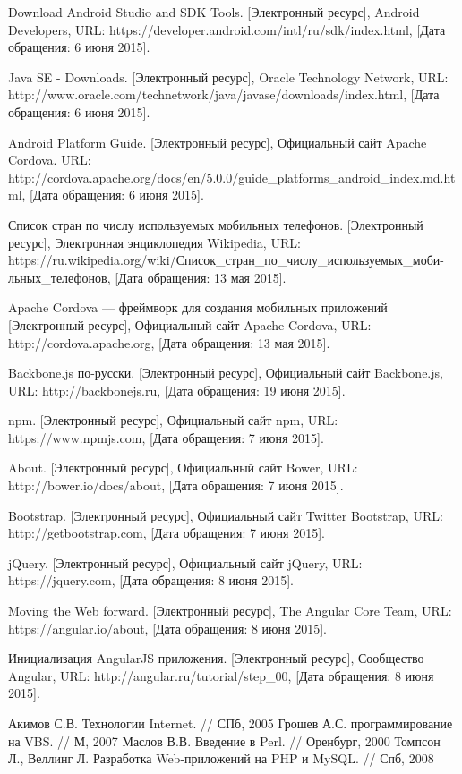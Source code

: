\begin{thebibliography}{1}
 Download Android Studio and SDK Tools. [Электронный ресурс], Android Developers, URL: https://developer.android.com/intl/ru/sdk/index.html, [Дата обращения: 6 июня 2015].

 Java SE - Downloads. [Электронный ресурс], Oracle Technology Network, URL: http://www.oracle.com/technetwork/java/javase/downloads/index.html, [Дата обращения: 6 июня 2015].

 Android Platform Guide. [Электронный ресурс],  Официальный сайт Apache Cordova. URL: http://cordova.apache.org/docs/en/5.0.0/guide\_platforms\_android\_index.md.html, [Дата обращения: 6 июня 2015].

 Список стран по числу используемых мобильных телефонов. [Электронный ресурс], Электронная энциклопедия Wikipedia, URL: https://ru.wikipedia.org/wiki/Список\_стран\_по\_числу\_используемых\_моби- льных\_телефонов, [Дата обращения: 13 мая 2015].

 Apache Cordova --- фреймворк для создания мобильных приложений [Электронный ресурс], Официальный сайт Apache Cordova, URL: http://cordova.apache.org, [Дата обращения: 13 мая 2015].

 Backbone.js по-русски. [Электронный ресурс], Официальный сайт Backbone.js, URL: http://backbonejs.ru, [Дата обращения: 19 июня 2015].

 npm. [Электронный ресурс], Официальный сайт npm, URL: https://www.npmjs.com, [Дата обращения: 7 июня 2015].

 About. [Электронный ресурс], Официальный сайт Bower, URL: http://bower.io/docs/about, [Дата обращения: 7 июня 2015].

 Bootstrap. [Электронный ресурс], Официальный сайт  Twitter Bootstrap, URL: http://getbootstrap.com, [Дата обращения: 7 июня 2015].

 jQuery. [Электронный ресурс], Официальный сайт jQuery, URL: https://jquery.com, [Дата обращения: 8 июня 2015].

 Moving the Web forward. [Электронный ресурс], The Angular Core Team, URL: https://angular.io/about, [Дата обращения: 8 июня 2015].

 Инициализация AngularJS приложения. [Электронный ресурс], Сообщество Angular, URL: http://angular.ru/tutorial/step\_00, [Дата обращения: 8 июня 2015].

 Акимов С.В. Технологии Internet. // СПб, 2005
 Грошев А.С. программирование на VBS. // М, 2007
 Маслов В.В. Введение в Perl. // Оренбург, 2000
 Томпсон Л., Веллинг Л. Разработка Web-приложений на PHP и MySQL. // Спб, 2008

\end{thebibliography}
